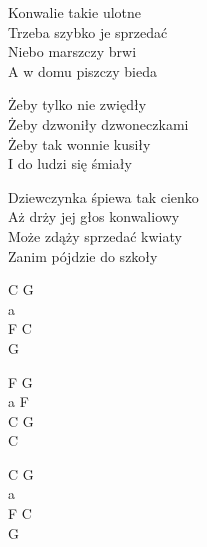 \begin{text}
    Konwalie takie ulotne\\
    Trzeba szybko je sprzedać\\
    Niebo marszczy brwi\\
    A w domu piszczy bieda

    Żeby tylko nie zwiędły\\
    Żeby dzwoniły dzwoneczkami\\
    Żeby tak wonnie kusiły\\
    I do ludzi się śmiały

    Dziewczynka śpiewa tak cienko\\
    Aż drży jej głos konwaliowy\\
    Może zdąży sprzedać kwiaty\\
    Zanim pójdzie do szkoły
\end{text}
\begin{chord}
    C G\\
    a\\
    F C\\
    G

    F G\\
    a F\\
    C G\\
    C

    C G\\
    a\\
    F C\\
    G
\end{chord}